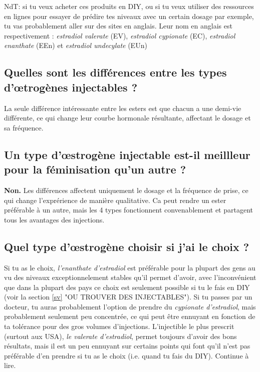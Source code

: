 \documentclass{article}
\begin{document}
NdT: si tu veux acheter ces produits en DIY, ou si tu veux utiliser des ressources en lignes pour essayer de prédire tes niveaux avec un certain dosage par exemple, tu vas probablement aller sur des sites en anglais. Leur nom en anglais est respectivement : \textit{estradiol valerate} (EV), \textit{estradiol cypionate} (EC), \textit{estradiol enanthate} (EEn) et \textit{estradiol undecylate} (EUn)

\subsection{Quelles sont les différences entre les types d'œtrogènes injectables ?}

La seule différence intéressante entre les esters est que chacun a une demi-vie différente, ce qui change leur courbe hormonale résultante, affectant le dosage et sa fréquence.

\subsection{Un type d'œstrogène injectable est-il meillleur pour la féminisation qu'un autre ?}

\textbf{Non.} Les différences affectent uniquement le dosage et la fréquence de prise, ce qui change l'exprérience de manière qualitative. Ca peut rendre un ester préférable à un autre, mais les 4 types fonctionnent convenablement et partagent tous les avantages des injections.

\subsection{Quel type d'œstrogène choisir si j'ai le choix ?}

Si tu as le choix, \textit{l'enanthate d'estradiol} est préférable pour la plupart des gens au vu des niveaux exceptionnelement stables qu'il permet d'avoir, avec l'inconvénient que dans la plupart des pays ce choix est seulement possible si tu le fais en DIY (voir la section \ref{sv} "OU TROUVER DES INJECTABLES"). Si tu passes par un docteur, tu auras probablement l'option de prendre du \textit{cypionate d'estradiol}, mais probablement seulement peu concentrée, ce qui peut être ennuyant en fonction de ta tolérance pour des gros volumes d'injections. L'injectible le plus prescrit (surtout aux USA), \textit{le valerate d'estradiol}, permet toujours d'avoir des bons résultats, mais il est un peu ennuyant sur certains points qui font qu'il n'est pas préférable d'en prendre si tu as le choix (i.e. quand tu fais du DIY). Continue à lire.
\end{document}
